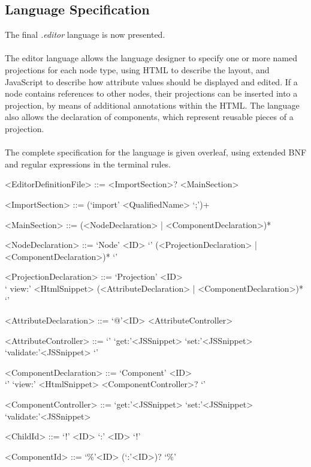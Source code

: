 \documentclass{article}
\begin{document}
{\subsection{Language Specification}
The final \emph{.editor} language is now presented. 
\\
\\
The editor language allows the language designer to specify one or more named projections for each node type, using HTML to describe the layout, and JavaScript to describe how attribute values should be displayed and edited. If a node contains references to other nodes, their projections can be inserted into a projection, by means of additional annotations within the HTML. The language also allows the declaration of components, which represent reusable pieces of a projection. 
\\
\\
The complete specification for the language is given overleaf, using extended BNF and regular expressions in the terminal rules.
\newpage
\setlength{\grammarparsep}{12pt plus 1pt minus 1pt} %
\setlength{\grammarindent}{5em} %

\begin{grammar}

<EditorDefinitionFile> ::= <ImportSection>? <MainSection>

<ImportSection> ::= (`import' <QualifiedName> `;')+ 

<MainSection> ::= (<NodeDeclaration> | <ComponentDeclaration>)*

<NodeDeclaration> ::= `Node' <ID> `{' (<ProjectionDeclaration> | <ComponentDeclaration>)* `}'

<ProjectionDeclaration> ::= `Projection' <ID> \\ `{ view:' <HtmlSnippet> (<AttributeDeclaration> | <ComponentDeclaration>)* `}'

<AttributeDeclaration> ::= `@'<ID> <AttributeController>

<AttributeController> ::= `{' `get:'<JSSnippet> `set:'<JSSnippet> `validate:'<JSSnippet> `}'

<ComponentDeclaration> ::= `Component' <ID> \\`{' `view:' <HtmlSnippet> <ComponentController>? `}'

<ComponentController> ::= `get:'<JSSnippet> `set:'<JSSnippet> `validate:'<JSSnippet> 
 
<ChildId> ::= `!' <ID> `:' <ID> `!'
 
<ComponentId> ::= `\%'<ID> (`:'<ID>)? `\%'


\end{grammar}}
\end{document}
